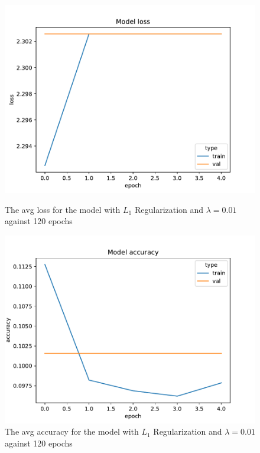 \documentclass{article}
\begin{document}
    \begin{figure}[H]
        \begin{minipage}[b]{0.5\linewidth}
            \centering
            \includegraphics[width=\textwidth]{../plots/config_2d_L1_-2_0.001_loss}
            \caption{The avg loss for the model with $L_1$ Regularization and $\lambda = 0.01$ against 120 epochs}
            \label{fig:figure7}
        \end{minipage}
        \hspace{0.2cm}
        \begin{minipage}[b]{0.5\linewidth}
            \centering
            \includegraphics[width=\textwidth]{../plots/config_2d_L1_-2_0.001_accuracy}
            \caption{The avg accuracy for the model with $L_1$ Regularization and $\lambda = 0.01$ against 120 epochs}
            \label{fig:figure8}
        \end{minipage}
    \end{figure}
\end{document}
